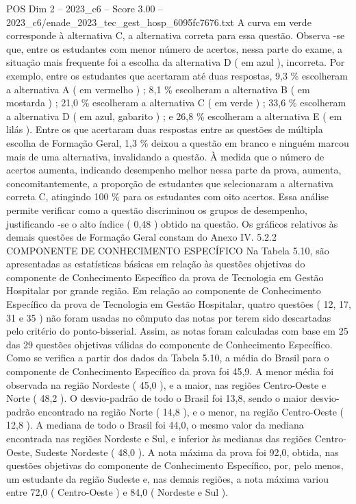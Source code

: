 \begin{textsample}{POS Dim 2 – 2023\_c6 – Score 3.00 – 2023\_c6/enade\_2023\_tec\_gest\_hosp\_6095fc7676.txt}
A curva em verde corresponde à alternativa C, a alternativa correta para essa questão.
Observa -se que, entre os estudantes com menor número de acertos, nessa parte do exame, a situação mais frequente foi a escolha da alternativa D ( em azul ), incorreta.
Por exemplo, entre os estudantes que acertaram até duas respostas, 9,3 \% escolheram a alternativa A ( em vermelho ) ; 8,1 \% escolheram a alternativa B ( em mostarda ) ; 21,0 \% escolheram a alternativa C ( em verde ) ; 33,6 \% escolheram a alternativa D ( em azul, gabarito ) ; e 26,8 \% escolheram a alternativa E ( em lilás ).
Entre os que acertaram duas respostas entre as questões de múltipla escolha de Formação Geral, 1,3 \% deixou a questão em branco e ninguém marcou mais de uma alternativa, invalidando a questão.
À medida que o número de acertos aumenta, indicando desempenho melhor nessa parte da prova, aumenta, concomitantemente, a proporção de estudantes que selecionaram a alternativa correta C, atingindo 100 \% para os estudantes com oito acertos.
Essa análise permite verificar como a questão discriminou os grupos de desempenho, justificando -se o alto índice ( 0,48 ) obtido na questão.
Os gráficos relativos às demais questões de Formação Geral constam do Anexo IV. 5.2.2 COMPONENTE DE CONHECIMENTO ESPECÍFICO Na Tabela 5.10, são apresentadas as estatísticas básicas em relação às questões objetivas do componente de Conhecimento Específico da prova de Tecnologia em Gestão Hospitalar por grande região.
Em relação ao componente de Conhecimento Específico da prova de Tecnologia em Gestão Hospitalar, quatro questões ( 12, 17, 31 e 35 ) não foram usadas no cômputo das notas por terem sido descartadas pelo critério do ponto-bisserial.
Assim, as notas foram calculadas com base em 25 das 29 questões objetivas válidas do componente de Conhecimento Específico.
Como se verifica a partir dos dados da Tabela 5.10, a média do Brasil para o componente de Conhecimento Específico da prova foi 45,9.
A menor média foi observada na região Nordeste ( 45,0 ), e a maior, nas regiões Centro-Oeste e Norte ( 48,2 ).
O desvio-padrão de todo o Brasil foi 13,8, sendo o maior desvio-padrão encontrado na região Norte ( 14,8 ), e o menor, na região Centro-Oeste ( 12,8 ).
A mediana de todo o Brasil foi 44,0, o mesmo valor da mediana encontrada nas regiões Nordeste e Sul, e inferior às medianas das regiões Centro-Oeste, Sudeste Nordeste ( 48,0 ).
A nota máxima da prova foi 92,0, obtida, nas questões objetivas do componente de Conhecimento Específico, por, pelo menos, um estudante da região Sudeste e, nas demais regiões, a nota máxima variou entre 72,0 ( Centro-Oeste ) e 84,0 ( Nordeste e Sul ).

\end{textsample}
